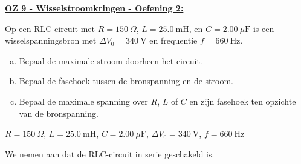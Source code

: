 \textbf{\underline{OZ 9 - Wisselstroomkringen - Oefening 2:}}
\vspace{0.5cm}

Op een RLC-circuit met $R = 150 \ \Omega$, $L = 25.0 \ \text{mH}$, en $ C = 2.00 \ \mu\text{F}$ is een wisselspanningsbron met $\Delta V_0 = 340 \ \text{V}$ en frequentie $f = 660 \ \text{Hz}$.

\begin{enumerate}[(a)]
    \item Bepaal de maximale stroom doorheen het circuit.
    \item Bepaal de fasehoek tussen de bronspanning en de stroom.
    \item Bepaal de maximale spanning over $R$, $L$ of $C$ en zijn fasehoek ten opzichte van de bronspanning.
\end{enumerate}

\begin{description}[labelwidth=1.5cm, leftmargin=!]
    \item[Geg. :] $R = 150 \ \Omega$, $L = 25.0 \ \text{mH}$, $ C = 2.00 \ \mu\text{F}$, $\Delta V_0 = 340 \ \text{V}$, $f = 660 \ \text{Hz}$
\end{description}

We nemen aan dat de RLC-circuit in serie geschakeld is. 

